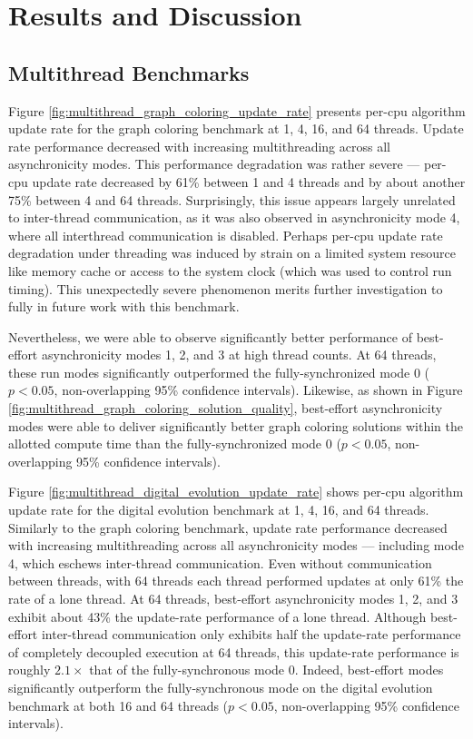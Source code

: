 \section{Results and Discussion}

\subsection{Multithread Benchmarks}



Figure \ref{fig:multithread_graph_coloring_update_rate} presents per-cpu algorithm update rate for the graph coloring benchmark at 1, 4, 16, and 64 threads.
Update rate performance decreased with increasing multithreading across all asynchronicity modes.
This performance degradation was rather severe --- per-cpu update rate decreased by 61\% between 1 and 4 threads and by about another 75\% between 4 and 64 threads.
Surprisingly, this issue appears largely unrelated to inter-thread communication, as it was also observed in asynchronicity mode 4, where all interthread communication is disabled.
Perhaps per-cpu update rate degradation under threading was induced by strain on a limited system resource like memory cache or access to the system clock (which was used to control run timing).
This unexpectedly severe phenomenon merits further investigation to fully in future work with this benchmark.

Nevertheless, we were able to observe significantly better performance of best-effort asynchronicity modes 1, 2, and 3 at high thread counts. 
At 64 threads, these run modes significantly outperformed the fully-synchronized mode 0 ($p < 0.05$, non-overlapping 95\% confidence intervals).
Likewise, as shown in Figure \ref{fig:multithread_graph_coloring_solution_quality}, best-effort asynchronicity modes were able to deliver significantly better graph coloring solutions within the allotted compute time than the fully-synchronized mode 0 ($p < 0.05$, non-overlapping 95\% confidence intervals).

Figure \ref{fig:multithread_digital_evolution_update_rate} shows per-cpu algorithm update rate for the digital evolution benchmark at 1, 4, 16, and 64 threads.
Similarly to the graph coloring benchmark, update rate performance decreased with increasing multithreading across all asynchronicity modes --- including mode 4, which eschews inter-thread communication.
Even without communication between threads, with 64 threads each thread performed updates at only 61\% the rate of a lone thread.
At 64 threads, best-effort asynchronicity modes 1, 2, and 3 exhibit about 43\% the update-rate performance of a lone thread.
Although best-effort inter-thread communication only exhibits half the update-rate performance of completely decoupled execution at 64 threads, this update-rate performance is roughly $2.1\times$ that of the fully-synchronous mode 0.
Indeed, best-effort modes significantly outperform the fully-synchronous mode on the digital evolution benchmark at both 16 and 64 threads ($p < 0.05$, non-overlapping 95\% confidence intervals).

